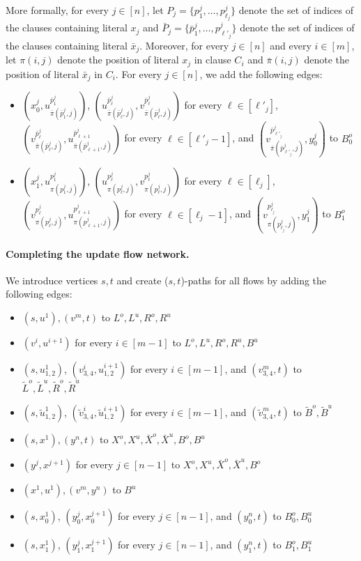 \documentclass[fontsize=11pt,paper=a4]{book}
\begin{document}
More formally, for every \(j\in[n]\), let \(P_j=\{p_1^j,\dots,p_{\ell_j}^j\}\) denote the set of indices of the clauses containing literal \(x_j\) and \(\bar{P}_j=\{\bar{p}_1^j,\dots,p_{\ell'_j}^j\}\) denote the set of indices of the clauses containing literal \(\bar{x}_j\).
Moreover, for every \(j\in[n]\) and every \(i\in[m]\), let \(\pi(i,j)\) denote the position of literal \(x_j\) in clause \(C_i\) and \(\bar{\pi}(i,j)\) denote the position of literal \(\bar{x}_j\) in \(C_i\).
For every \(j\in[n]\), we add the following edges:

\begin{itemize}
\item \((x_0^j,u_{\bar{\pi}(\bar{p}_1^j,j)}^{\bar{p}_1^j})\), \((u_{\bar{\pi}(\bar{p}_{\ell}^j,j)}^{\bar{p}_{\ell}^j},v_{\bar{\pi}(\bar{p}_{\ell}^j,j)}^{\bar{p}_{\ell}^j})\) for every \(\ell\in[\ell'_j]\), \((v_{\bar{\pi}(\bar{p}_{\ell}^j,j)}^{\bar{p}_{\ell}^j},u_{\bar{\pi}(\bar{p}_{\ell+1}^j,j)}^{\bar{p}_{\ell+1}^j})\) for every \(\ell\in[\ell'_j-1]\), and \((v_{\bar{\pi}(\bar{p}_{\ell'_j}^j,j)}^{\bar{p}_{\ell'_j}^j},y_0^j)\) to \(B_0^o\)
\item \((x_1^j,u_{\pi(p_1^j,j)}^{p_1^j})\), \((u_{\pi(p_{\ell}^j,j)}^{p_{\ell}^j},v_{\pi(p_{\ell}^j,j)}^{p_{\ell}^j})\) for every \(\ell\in[\ell_j]\), \((v_{\pi(p_{\ell}^j,j)}^{p_{\ell}^j},u_{\pi(p_{\ell+1}^j,j)}^{p_{\ell+1}^j})\) for every \(\ell\in[\ell_j-1]\), and \((v_{\pi(p_{\ell_j}^j,j)}^{p_{\ell_j}^j},y_1^j)\) to \(B_1^o\)
\end{itemize}

\paragraph{Completing the update flow network.}
We introduce vertices \(s,t\) and create (\(s,t\))-paths for all flows by adding the following edges:

\begin{itemize}
\item \((s,u^1),(v^m,t)\) to \(L^o,L^u,R^o,R^u\)
\item \((v^i,u^{i+1})\) for every \(i\in[m-1]\) to \(L^o,L^u,R^o,R^u,B^u\)
\item \((s,u_{1,2}^1)\), \((v_{3,4}^i,u_{1,2}^{i+1})\) for every \(i\in[m-1]\), and \((v_{3,4}^m,t)\) to \(\tilde{L}^o,\tilde{L}^u,\tilde{R}^o,\tilde{R}^u\)
\item \((s,\tilde{u}_{1,2}^1)\), \((\tilde{v}_{3,4}^i,\tilde{u}_{1,2}^{i+1})\) for every \(i\in[m-1]\), and \((\tilde{v}_{3,4}^m,t)\) to \(\tilde{B}^o,\tilde{B}^u\)
\item \((s,x^1),(y^n,t)\) to \(X^o,X^u,\bar{X}^o,\bar{X}^u,B^o,B^u\)
\item \((y^j,x^{j+1})\) for every \(j\in[n-1]\) to \(X^o,X^u,\bar{X}^o,\bar{X}^u,B^o\)
\item \((x^1,u^1),(v^m,y^n)\) to \(B^u\)
\item \((s,x_0^1)\), \((y_0^j,x_0^{j+1})\) for every \(j\in[n-1]\), and \((y_0^n,t)\) to \(B_0^o,B_0^u\)
\item \((s,x_1^1)\), \((y_1^j,x_1^{j+1})\) for every \(j\in[n-1]\), and \((y_1^n,t)\) to \(B_1^o,B_1^u\)
\end{itemize}
\end{document}
